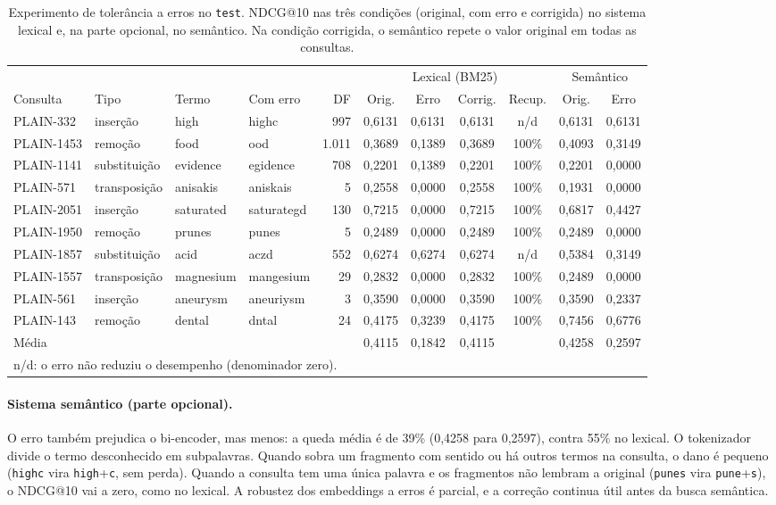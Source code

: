 \documentclass[11pt,a4paper]{article}
\newcommand{\cod}[1]{\texttt{#1}}
\begin{document}
\begin{table}[!htb]
\centering\footnotesize
\setlength{\tabcolsep}{3.5pt}
\caption{Experimento de tolerância a erros no \cod{test}. NDCG@10 nas três condições (original, com erro e corrigida) no sistema lexical e, na parte opcional, no semântico. Na condição corrigida, o semântico repete o valor original em todas as consultas.}
\label{tab:typotest}
\begin{tabular}{llllrcccccc}
\toprule
 & & & & & \multicolumn{4}{c}{Lexical (BM25)} & \multicolumn{2}{c}{Semântico} \\
\cmidrule(lr){6-9}\cmidrule(lr){10-11}
Consulta & Tipo & Termo & Com erro & DF & Orig. & Erro & Corrig. & Recup. & Orig. & Erro \\
\midrule
PLAIN-332 & inserção & high & highc & 997 & 0,6131 & 0,6131 & 0,6131 & n/d & 0,6131 & 0,6131 \\
PLAIN-1453 & remoção & food & ood & 1.011 & 0,3689 & 0,1389 & 0,3689 & 100\% & 0,4093 & 0,3149 \\
PLAIN-1141 & substituição & evidence & egidence & 708 & 0,2201 & 0,1389 & 0,2201 & 100\% & 0,2201 & 0,0000 \\
PLAIN-571 & transposição & anisakis & aniskais & 5 & 0,2558 & 0,0000 & 0,2558 & 100\% & 0,1931 & 0,0000 \\
PLAIN-2051 & inserção & saturated & saturategd & 130 & 0,7215 & 0,0000 & 0,7215 & 100\% & 0,6817 & 0,4427 \\
PLAIN-1950 & remoção & prunes & punes & 5 & 0,2489 & 0,0000 & 0,2489 & 100\% & 0,2489 & 0,0000 \\
PLAIN-1857 & substituição & acid & aczd & 552 & 0,6274 & 0,6274 & 0,6274 & n/d & 0,5384 & 0,3149 \\
PLAIN-1557 & transposição & magnesium & mangesium & 29 & 0,2832 & 0,0000 & 0,2832 & 100\% & 0,2489 & 0,0000 \\
PLAIN-561 & inserção & aneurysm & aneuriysm & 3 & 0,3590 & 0,0000 & 0,3590 & 100\% & 0,3590 & 0,2337 \\
PLAIN-143 & remoção & dental & dntal & 24 & 0,4175 & 0,3239 & 0,4175 & 100\% & 0,7456 & 0,6776 \\
\midrule
Média & & & & & 0,4115 & 0,1842 & 0,4115 & & 0,4258 & 0,2597 \\
\bottomrule
\multicolumn{11}{l}{n/d: o erro não reduziu o desempenho (denominador zero).}
\end{tabular}
\end{table}

\paragraph{Sistema semântico (parte opcional).} O erro também prejudica o bi-encoder, mas menos: a queda média é de 39\% (0,4258 para 0,2597), contra 55\% no lexical. O tokenizador divide o termo desconhecido em subpalavras. Quando sobra um fragmento com sentido ou há outros termos na consulta, o dano é pequeno (\cod{highc} vira \cod{high}+\cod{c}, sem perda). Quando a consulta tem uma única palavra e os fragmentos não lembram a original (\cod{punes} vira \cod{pune}+\cod{s}), o NDCG@10 vai a zero, como no lexical. A robustez dos embeddings a erros é parcial, e a correção continua útil antes da busca semântica.
\end{document}
